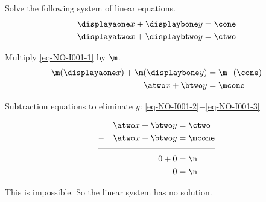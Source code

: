 






\pgfmathtruncatemacro{\mcone}{\m*\cone}



\pgfmathtruncatemacro{\atwo}{\m*\aone} %
\pgfmathtruncatemacro{\btwo}{\m*\bone}
\pgfmathtruncatemacro{\ctwo}{\mcone+\n}





\setcounter{equation}{0}



Solve the following system of linear equations.
\begin{align}
\displayaone x + \displaybone y &= \cone  \label{eq-NO-I001-1}\\
\displayatwo x + \displaybtwo y &= \ctwo  \label{eq-NO-I001-2}
\end{align}

\begin{solution}
		Multiply \eqref{eq-NO-I001-1} by $\m$.
		\begin{align}
		\m(\displayaone x) + \m(\displaybone y) &=\m\cdot(\cone) \nonumber \\
		\atwo x + \btwo y &= \mcone \label{eq-NO-I001-3}
		\end{align}
		
		Subtraction equations to eliminate $y$: \eqref{eq-NO-I001-2}$-$\eqref{eq-NO-I001-3} 

\begin{align}
&& \atwo x + \btwo y &= \ctwo \nonumber \\
-&& \atwo x + \btwo y &= \mcone  \nonumber\\[-0.5em]
\cline{1-4}
&& 0+0 &=\n \nonumber\\
&& 0&=\n \nonumber
\end{align}

This is impossible. So the linear system has no solution.
\end{solution}
